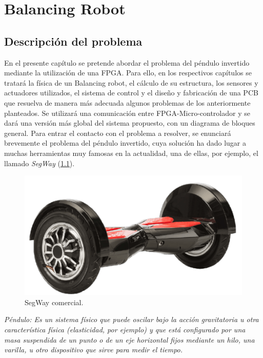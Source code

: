 \chapter{Balancing Robot}\label{sec: BalancingRobot}
\section{Descripción del problema}
En el presente capítulo se pretende abordar el problema del péndulo invertido mediante la utilización de una FPGA. Para ello, en los respectivos capítulos se tratará la física de un Balancing robot, el cálculo de su estructura, los sensores y actuadores utilizados, el sistema de control y el diseño y fabricación de una PCB que resuelva de manera más adecuada algunos problemas de los anteriormente planteados. Se utilizará una comunicación entre FPGA-Micro-controlador y se dará una versión más global del sistema propuesto, con un diagrama de bloques general. \newline
\newline Para entrar el contacto con el problema a resolver, se enunciará brevemente el problema del péndulo invertido, cuya solución ha dado lugar a muchas herramientas muy famosas en la actualidad, una de ellas, por ejemplo, el llamado \textit{SegWay} (\ref{fig:segway}).

\begin{figure}[H]
	\center
	\includegraphics[trim = 0mm 0mm 0mm 0mm, clip,scale=0.4]{imagenes/Balancing_robot/segway}
	\caption{SegWay comercial.}
	\label{fig:segway}
\end{figure}


\textsl{Péndulo: Es un sistema físico que puede oscilar bajo la acción gravitatoria u otra característica física (elasticidad, por ejemplo) y que está configurado por una masa suspendida de un punto o de un eje horizontal fijos mediante un hilo, una varilla, u otro dispositivo que sirve para medir el tiempo.} \newline

